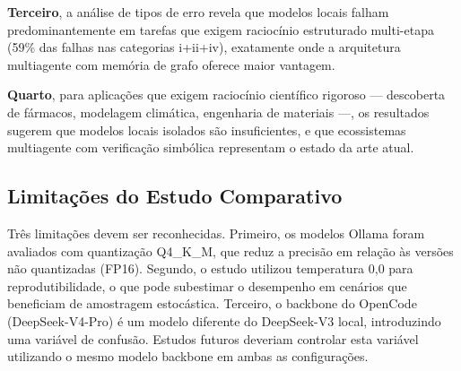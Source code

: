 \textbf{Terceiro}, a análise de tipos de erro revela que modelos locais falham
predominantemente em tarefas que exigem raciocínio estruturado multi-etapa
(59\% das falhas nas categorias i+ii+iv), exatamente onde a arquitetura
multiagente com memória de grafo oferece maior vantagem.

\textbf{Quarto}, para aplicações que exigem raciocínio científico rigoroso
— descoberta de fármacos, modelagem climática, engenharia de materiais —,
os resultados sugerem que modelos locais isolados são insuficientes, e que
ecossistemas multiagente com verificação simbólica representam o estado da
arte atual.

\subsection{Limitações do Estudo Comparativo}

Três limitações devem ser reconhecidas. Primeiro, os modelos Ollama foram
avaliados com quantização Q4\_K\_M, que reduz a precisão em relação às
versões não quantizadas (FP16). Segundo, o estudo utilizou temperatura 0,0
para reprodutibilidade, o que pode subestimar o desempenho em cenários que
beneficiam de amostragem estocástica. Terceiro, o backbone do OpenCode
(DeepSeek-V4-Pro) é um modelo diferente do DeepSeek-V3 local, introduzindo
uma variável de confusão. Estudos futuros deveriam controlar esta variável
utilizando o mesmo modelo backbone em ambas as configurações.
